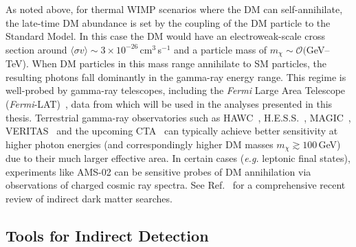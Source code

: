 As noted above, for thermal WIMP scenarios where the DM can self-annihilate, the late-time DM abundance is set by the coupling of the DM particle to the Standard Model. In this case the DM would have an electroweak-scale cross section around $\langle\sigma v\rangle\sim 3\times10^{-26}$\,cm$^3$\,s$^{-1}$ and a particle mass of $m_\chi\sim\mathcal O($GeV--TeV). When DM particles in this mass range annihilate to SM particles, the resulting photons fall dominantly in the gamma-ray energy range. This regime is well-probed by gamma-ray telescopes, including the \emph{Fermi} Large Area Telescope (\emph{Fermi}-LAT)~\cite{Atwood:2009ez}, data from which will be used in the analyses presented in this thesis. Terrestrial gamma-ray observatories such as HAWC~\cite{Abeysekara:2014ffg}, H.E.S.S.~\cite{Abdallah:2018qtu}, MAGIC~\cite{Ahnen:2017pqx}, VERITAS~\cite{Archambault:2017wyh} and the upcoming CTA~\cite{Doro:2012xx} can typically achieve better sensitivity at higher photon energies (and correspondingly higher DM masses $m_\chi\gtrsim 100$\,GeV) due to their much larger effective area. In certain cases (\emph{e.g.} leptonic final states), experiments like AMS-02 can be sensitive probes of DM annihilation via observations of charged cosmic ray spectra. See Ref.~\cite{Slatyer:2017sev} for a comprehensive recent review of indirect dark matter searches.   %

\subsection{Tools for Indirect Detection}
\label{subsec:tools}

